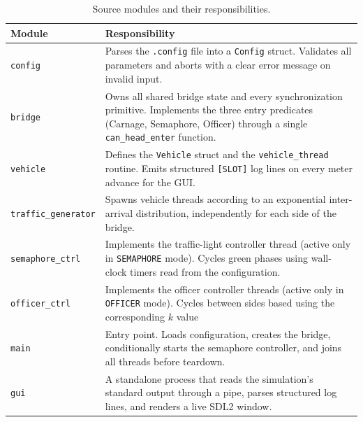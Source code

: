 \documentclass[12pt]{article}
\begin{document}
\begin{table}[h!]
  \centering
  \caption{Source modules and their responsibilities.}
  \label{tab:modules}
  \begin{tabular}{lp{9cm}}
    \toprule
    \textbf{Module} & \textbf{Responsibility} \\
    \midrule
    \texttt{config}           & Parses the \texttt{.config} file into a
                                \texttt{Config} struct. Validates all
                                parameters and aborts with a clear error
                                message on invalid input. \\[4pt]
    \texttt{bridge}           & Owns all shared bridge state and every
                                synchronization primitive. Implements the
                                three entry predicates (Carnage, Semaphore,
                                Officer) through a single
                                \texttt{can\_head\_enter} function. \\[4pt]
    \texttt{vehicle}          & Defines the \texttt{Vehicle} struct and the
                                \texttt{vehicle\_thread} routine. Emits
                                structured \texttt{[SLOT]} log lines on
                                every meter advance for the GUI. \\[4pt]
    \texttt{traffic\_generator} & Spawns vehicle threads according to an
                                exponential inter-arrival distribution,
                                independently for each side of the bridge. \\[4pt]
    \texttt{semaphore\_ctrl}  & Implements the traffic-light controller
                                thread (active only in \texttt{SEMAPHORE}
                                mode). Cycles green phases using wall-clock
                                timers read from the configuration. \\[4pt]
    \texttt{officer\_ctrl}  & Implements the officer controller
                                threads (active only in \texttt{OFFICER}
                                mode). Cycles between sides based using the corresponding $k$ value \\[4pt]
    \texttt{main}             & Entry point. Loads configuration, creates
                                the bridge, conditionally starts the
                                semaphore controller, and joins all threads
                                before teardown. \\[4pt]
    \texttt{gui}              & A standalone process that reads the
                                simulation's standard output through a pipe,
                                parses structured log lines, and renders a
                                live SDL2 window. \\
    \bottomrule
  \end{tabular}
\end{table}
\end{document}

